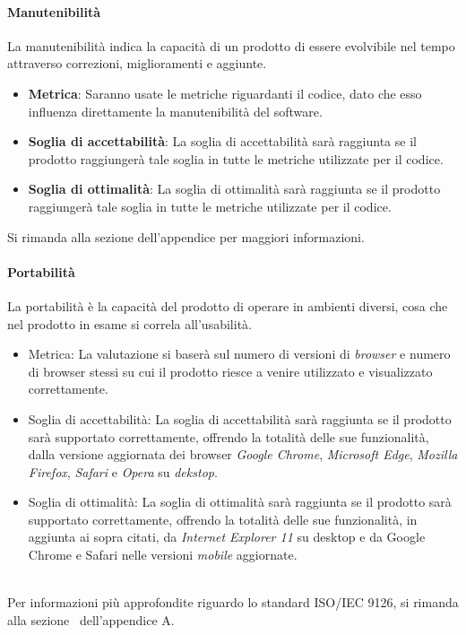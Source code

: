 \paragraph{Manutenibilità}
La manutenibilità indica la capacità di un prodotto di essere evolvibile nel tempo attraverso correzioni, miglioramenti e aggiunte.

\begin{itemize}
\item \textbf{Metrica}: Saranno usate le metriche riguardanti il codice, dato che esso influenza direttamente la manutenibilità del software.
\item \textbf{Soglia di accettabilità}: La soglia di accettabilità sarà raggiunta se il prodotto raggiungerà tale soglia in tutte le metriche utilizzate per il codice.
\item \textbf{Soglia di ottimalità}: La soglia di ottimalità sarà raggiunta se il prodotto raggiungerà tale soglia in tutte le metriche utilizzate per il codice.
\end{itemize}

Si rimanda alla sezione dell'appendice per maggiori informazioni.

\paragraph{Portabilità}
La portabilità è la capacità del prodotto di operare in ambienti diversi, cosa che nel prodotto in esame si correla all'usabilità.

\begin{itemize}
	\item Metrica: La valutazione si baserà sul numero di versioni di \emph{browser} e numero di browser stessi su cui il prodotto riesce a venire utilizzato e visualizzato correttamente.
	\item Soglia di accettabilità: La soglia di accettabilità sarà raggiunta se il prodotto sarà supportato correttamente, offrendo la totalità delle sue funzionalità, dalla versione aggiornata dei browser \emph{Google Chrome}, \emph{Microsoft Edge}, \emph{Mozilla Firefox}, \emph{Safari} e \emph{Opera} su \emph{dekstop}.
	\item Soglia di ottimalità: La soglia di ottimalità sarà raggiunta se il prodotto sarà supportato correttamente, offrendo la totalità delle sue funzionalità, in aggiunta ai sopra citati, da \emph{Internet Explorer 11} su desktop e da Google Chrome e Safari nelle versioni \emph{mobile} aggiornate.
\end{itemize}

~\\
Per informazioni più approfondite riguardo lo standard ISO/IEC 9126, si rimanda alla sezione~ dell'appendice A.



